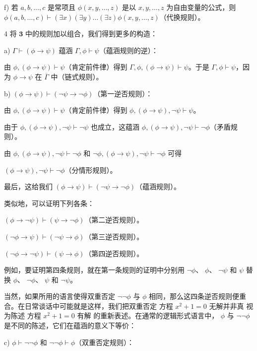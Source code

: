 f) 若 $a, b, \ldots, c$ 是常项且 $\phi(x, y, \ldots, z)$ 是以 $x, y, \ldots, z$ 为自由变量的公式，则 $\phi(a, b, \ldots, c) \vdash (\exists x)(\exists y) \ldots (\exists z)\phi(x, y, \ldots, z)$（代换规则）。

4 将  $ \mathbf{3} $ 中的规则加以组合，我们得到更多的构造：

a)  $ \Gamma \vdash (\phi \to \psi) $ 蕴涵  $ \Gamma, \phi \vdash \psi $（蕴涵规则的逆）：

由 $\phi, (\phi \to \psi) \vdash \psi$（肯定前件律）得到 $\Gamma, \phi, (\phi \to \psi) \vdash \psi$。于是 $\Gamma, \phi \vdash \psi$，因为 $\phi \to \psi$ 在 $\overline{\Gamma}$ 中（链式规则）。

b)  $ (\phi \to \psi) \vdash (\neg \psi \to \neg \phi) $（第一逆否规则）：

由  $ \phi, (\phi \to \psi) \vdash \psi $（肯定前件律）得到  $ \phi, (\phi \to \psi), \neg \psi \vdash \psi $。

由于  $ \phi, (\phi \to \psi), \neg\psi \vdash \neg\psi $ 也成立，这蕴涵  $ \phi, (\phi \to \psi), \neg\psi \vdash \neg\phi $（矛盾规则）。

由 $\phi, (\phi \to \psi), \neg\psi \vdash \neg\phi$ 和 $\neg\phi, (\phi \to \psi), \neg\psi \vdash \neg\phi$ 可得

$ (\phi \to \psi), \neg\psi \vdash \neg\phi $（分情形规则）。

最后，这给我们  $ (\phi \to \psi) \vdash (\neg \psi \to \neg \phi) $（蕴涵规则）。

类似地，可以证明下列各条：

$ (\phi \to \neg\psi) \vdash (\psi \to \neg\phi) $（第二逆否规则）。

$ (\neg\phi \to \psi) \vdash (\neg\psi \to \phi) $（第三逆否规则）。

$ (\neg\phi \to \neg\psi) \vdash (\psi \to \phi) $（第四逆否规则）。

例如，要证明第四条规则，就在第一条规则的证明中分别用  $ \neg\phi $、 $ \phi $、 $ \neg\psi $ 和  $ \psi $ 替换  $ \phi $、 $ \neg\phi $、 $ \psi $ 和  $ \neg\psi $。

当然，如果所用的语言使得双重否定  $ \neg \neg \phi $ 与  $ \phi $ 相同，那么这四条逆否规则便重合。在日常谈话中可能就是这样，我们把双重否定 方程  $ x^2 + 1 = 0 $ 无解并非真 视为陈述 方程  $ x^2 + 1 = 0 $ 有解 的重新表述。在通常的逻辑形式语言中， $ \phi $ 与  $ \neg \neg \phi $ 是不同的陈述，它们在蕴涵的意义下等价：

c)  $ \phi \vdash \neg \neg \phi $ 和  $ \neg \neg \phi \vdash \phi $（双重否定规则）：


